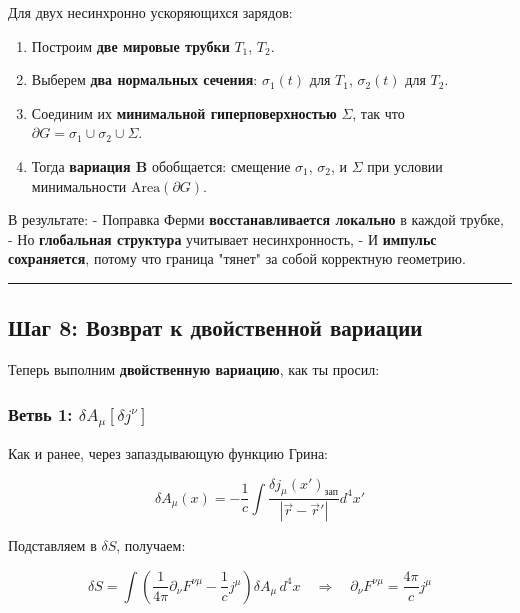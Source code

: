 \documentclass[11pt]{article}
\providecommand{\tightlist}{%
      \setlength{\itemsep}{0pt}\setlength{\parskip}{0pt}}
\begin{document}
Для двух несинхронно ускоряющихся зарядов:

\begin{enumerate}
\def\labelenumi{\arabic{enumi}.}
\tightlist
\item
  Построим \textbf{две мировые трубки} \(T_1\), \(T_2\).
\item
  Выберем \textbf{два нормальных сечения}: \(\sigma_1(t)\) для \(T_1\),
  \(\sigma_2(t)\) для \(T_2\).
\item
  Соединим их \textbf{минимальной гиперповерхностью} \(\Sigma\), так что
  \(\partial G = \sigma_1 \cup \sigma_2 \cup \Sigma\).
\item
  Тогда \textbf{вариация B} обобщается: смещение \(\sigma_1\),
  \(\sigma_2\), и \(\Sigma\) при условии минимальности
  \(\text{Area}(\partial G)\).
\end{enumerate}

 В результате: - Поправка Ферми \textbf{восстанавливается локально} в
каждой трубке, - Но \textbf{глобальная структура} учитывает
несинхронность, - И \textbf{импульс сохраняется}, потому что граница
"тянет" за собой корректную геометрию.

\begin{center}\rule{0.5\linewidth}{\linethickness}\end{center}

\subsection{ Шаг 8: Возврат к двойственной вариации}

Теперь выполним \textbf{двойственную вариацию}, как ты просил:

\subsubsection{\texorpdfstring{Ветвь 1:
\(\delta A_\mu[\delta j^\nu]\)}{Ветвь 1: \textbackslash{}delta A\_\textbackslash{}mu{[}\textbackslash{}delta j\^{}\textbackslash{}nu{]}}}

Как и ранее, через запаздывающую функцию Грина:

\[
\delta A_\mu(x) = -\frac{1}{c} \int \frac{\delta j_\mu(x')_{\text{зап}}}{|\vec{r} - \vec{r}'|} d^4x'
\]

Подставляем в \(\delta S\), получаем:

\[
\delta S = \int \left( \frac{1}{4\pi} \partial_\nu F^{\nu\mu} - \frac{1}{c} j^\mu \right) \delta A_\mu \, d^4x
\quad \Rightarrow \quad
\partial_\nu F^{\nu\mu} = \frac{4\pi}{c} j^\mu
\]
\end{document}
